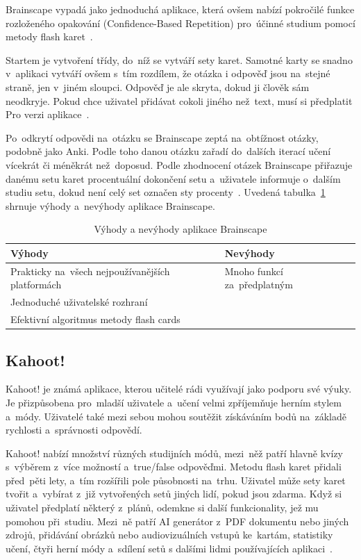 \documentclass[twoside]{ctuthesis}
\begin{document}
Brainscape vypadá jako jednoduchá aplikace, která ovšem nabízí pokročilé funkce rozloženého opakování (Confidence-Based Repetition) pro~účinné studium pomocí metody flash karet~\cite{ransom, brainscape}.

Startem je vytvoření třídy, do~níž se vytváří sety karet. Samotné karty se snadno v~aplikaci vytváří ovšem s~tím rozdílem, že otázka i odpověď jsou na~stejné straně, jen v~jiném sloupci. Odpověď je ale skryta, dokud ji člověk sám neodkryje. Pokud chce uživatel přidávat cokoli jiného než~text, musí si předplatit Pro verzi aplikace~\cite{ransom}.

Po~odkrytí odpovědi na~otázku se Brainscape zeptá na~obtížnost otázky, podobně jako Anki. Podle toho danou otázku zařadí do~dalších iterací učení vícekrát či méněkrát než~doposud. Podle zhodnocení otázek Brainscape přiřazuje danému setu karet procentuální dokončení setu a~uživatele informuje o~dalším studiu setu, dokud není celý set označen sty procenty~\cite{ransom}. Uvedená tabulka~\ref{tab:brain} shrnuje výhody a~nevýhody aplikace Brainscape.

\begin{table}[H]
\caption{Výhody a nevýhody aplikace Brainscape}
\begin{tabular}{| >{\centering\arraybackslash}m{5cm} | >{\centering\arraybackslash}m{5cm} |}
\hline
\textbf{Výhody} & \textbf{Nevýhody} \\ \hline
Prakticky na~všech nejpoužívanějších platformách & Mnoho funkcí za~předplatným \\ \hline
Jednoduché uživatelské rozhraní & \\ \hline
Efektivní algoritmus metody flash cards & \\ \hline
\end{tabular}
\label{tab:brain}
\end{table}

\subsection{Kahoot!}

Kahoot! je známá aplikace, kterou učitelé rádi využívají jako podporu své výuky. Je přizpůsobena pro~mladší uživatele a~učení velmi zpříjemňuje herním stylem a~módy. Uživatelé také mezi sebou mohou soutěžit získáváním bodů na~základě rychlosti a~správnosti odpovědí.

Kahoot! nabízí množství různých studijních módů, mezi~něž patří hlavně kvízy s~výběrem z~více možností a~true/false odpověďmi. Metodu flash karet přidali před~pěti lety, a~tím rozšířili pole působnosti na~trhu. Uživatel může sety karet tvořit a~vybírat z~již vytvořených setů jiných lidí, pokud jsou zdarma. Když si uživatel předplatí některý z~plánů, odemkne si další funkcionality, jež mu pomohou při~studiu. Mezi~ně patří AI generátor z~PDF dokumentu nebo jiných zdrojů, přidávání obrázků nebo audiovizuálních vstupů ke~kartám, statistiky učení, čtyři herní módy a~sdílení setů s dalšími lidmi používajících aplikaci~\cite{kahoot, kahoot-plan}.
\end{document}
